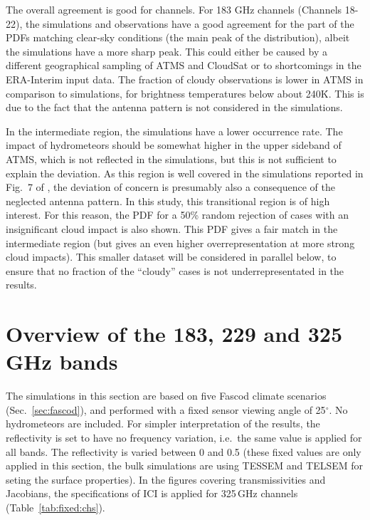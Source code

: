 \documentclass[12pt]{article}
\begin{document}
The overall agreement is good for channels. For 183 GHz channels (Channels
18-22), the simulations and observations have a good agreement for the part of
the PDFs matching clear-sky conditions (the main peak of the distribution),
albeit the simulations have a more sharp peak. This could either be caused by a
different geographical sampling of ATMS and CloudSat or to shortcomings in the
ERA-Interim input data. The fraction of cloudy observations is lower in ATMS in
comparison to simulations, for brightness temperatures below about 240\.K. This
is due to the fact that the antenna pattern is not considered in the
simulations.

In the intermediate region, the simulations have a lower occurrence rate. The
impact of hydrometeors should be somewhat higher in the upper sideband of ATMS,
which is not reflected in the simulations, but this is not sufficient to
explain the deviation. As this region is well covered in the simulations
reported in Fig.~7 of \citep{eriksson:towar:20}, the deviation of concern is
presumably also a consequence of the neglected antenna pattern. In this study,
this transitional region is of high interest. For this reason, the PDF for a
50\% random rejection of cases with an insignificant cloud impact is also
shown. This PDF gives a fair match in the intermediate region (but gives an
even higher overrepresentation at more strong cloud impacts). This smaller
dataset will be considered in parallel below, to ensure that no fraction of the
``cloudy'' cases is not underrepresentated in the results.





\section{Overview of the 183, 229 and 325\,GHz bands}
\label{sec:overview}
% 
The simulations in this section are based on five Fascod climate scenarios
(Sec.~\ref{sec:fascod}), and performed with a fixed sensor viewing angle of
25$^\circ$. No hydrometeors are included. For simpler interpretation of the
results, the reflectivity is set to have no frequency variation, i.e.\ the same
value is applied for all bands. The reflectivity is varied between 0 and 0.5
(these fixed values are only applied in this section, the bulk simulations are
using TESSEM and TELSEM for seting the surface properties).
In the figures covering transmissivities and Jacobians, the specifications
of ICI is applied for 325\,GHz channels (Table~\ref{tab:fixed:chs}).
\end{document}
